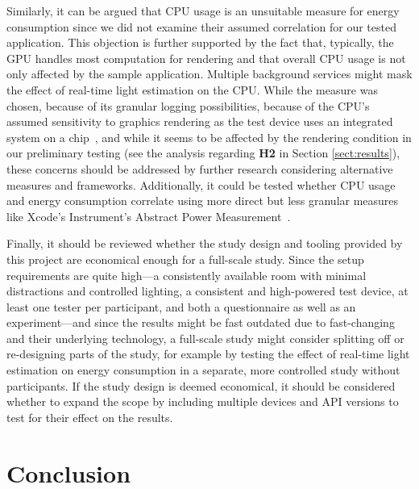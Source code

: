 \documentclass[12pt,twoside,english]{article}
\begin{document}
Similarly, it can be argued that \gls{CPU} usage is an unsuitable measure for energy consumption since we did not examine their assumed correlation for our tested application.
This objection is further supported by the fact that, typically, the \gls{GPU} handles most computation for rendering and that overall \gls{CPU} usage is not only affected by the sample application.
Multiple background services might mask the effect of real-time light estimation on the \gls{CPU}.
While the measure was chosen, because of its granular logging possibilities, because of the \gls{CPU}'s assumed sensitivity to graphics rendering as the test device uses an integrated system on a chip~\cite{apple_apple_2017}, and while it seems to be affected by the rendering condition in our preliminary testing (see the analysis regarding \textbf{H2} in Section \ref{sect:results}), these concerns should be addressed by further research considering alternative measures and frameworks.
Additionally, it could be tested whether \gls{CPU} usage and energy consumption correlate using more direct but less granular measures like Xcode's Instrument's Abstract Power Measurement~\cite{apple_abstract_2020}.

Finally, it should be reviewed whether the study design and tooling provided by this project are economical enough for a full-scale study.
Since the setup requirements are quite high---a consistently available room with minimal distractions and controlled lighting, a consistent and high-powered test device, at least one tester per participant, and both a questionnaire as well as an experiment---and since the results might be fast outdated due to fast-changing  and their underlying technology, a full-scale study might consider splitting off or re-designing parts of the study, for example by testing the effect of real-time light estimation on energy consumption in a separate, more controlled study without participants.
If the study design is deemed economical, it should be considered whether to expand the scope by including multiple devices and API versions to test for their effect on the results.

\section{Conclusion}
\label{sect:conclusion}
\end{document}
